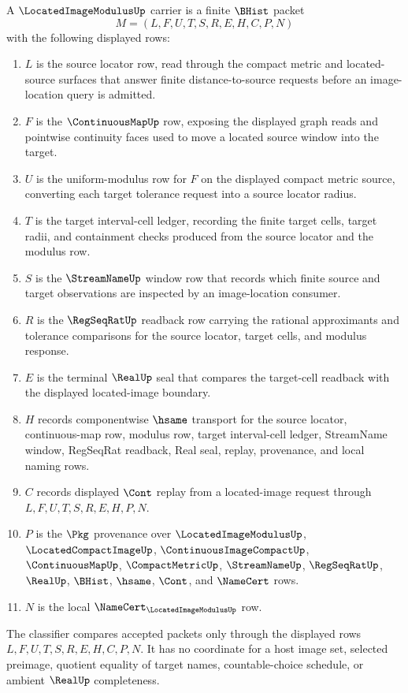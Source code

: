 \begin{definition}
\label{def:located-image-modulus-carrier}
A $\LocatedImageModulusUp$ carrier is a finite $\BHist$ packet
$$
M=(L,F,U,T,S,R,E,H,C,P,N)
$$
with the following displayed rows:
\begin{enumerate}
\item $L$ is the source locator row, read through the compact metric and located-source surfaces that answer finite distance-to-source requests before an image-location query is admitted.
\item $F$ is the $\ContinuousMapUp$ row, exposing the displayed graph reads and pointwise continuity faces used to move a located source window into the target.
\item $U$ is the uniform-modulus row for $F$ on the displayed compact metric source, converting each target tolerance request into a source locator radius.
\item $T$ is the target interval-cell ledger, recording the finite target cells, target radii, and containment checks produced from the source locator and the modulus row.
\item $S$ is the $\StreamNameUp$ window row that records which finite source and target observations are inspected by an image-location consumer.
\item $R$ is the $\RegSeqRatUp$ readback row carrying the rational approximants and tolerance comparisons for the source locator, target cells, and modulus response.
\item $E$ is the terminal $\RealUp$ seal that compares the target-cell readback with the displayed located-image boundary.
\item $H$ records componentwise $\hsame$ transport for the source locator, continuous-map row, modulus row, target interval-cell ledger, StreamName window, RegSeqRat readback, Real seal, replay, provenance, and local naming rows.
\item $C$ records displayed $\Cont$ replay from a located-image request through $L,F,U,T,S,R,E,H,P,N$.
\item $P$ is the $\Pkg$ provenance over $\LocatedImageModulusUp$, $\LocatedCompactImageUp$, $\ContinuousImageCompactUp$, $\ContinuousMapUp$, $\CompactMetricUp$, $\StreamNameUp$, $\RegSeqRatUp$, $\RealUp$, $\BHist$, $\hsame$, $\Cont$, and $\NameCert$ rows.
\item $N$ is the local $\NameCert_{\LocatedImageModulusUp}$ row.
\end{enumerate}
The classifier compares accepted packets only through the displayed rows $L,F,U,T,S,R,E,H,C,P,N$. It has no coordinate for a host image set, selected preimage, quotient equality of target names, countable-choice schedule, or ambient $\RealUp$ completeness.
\end{definition}

